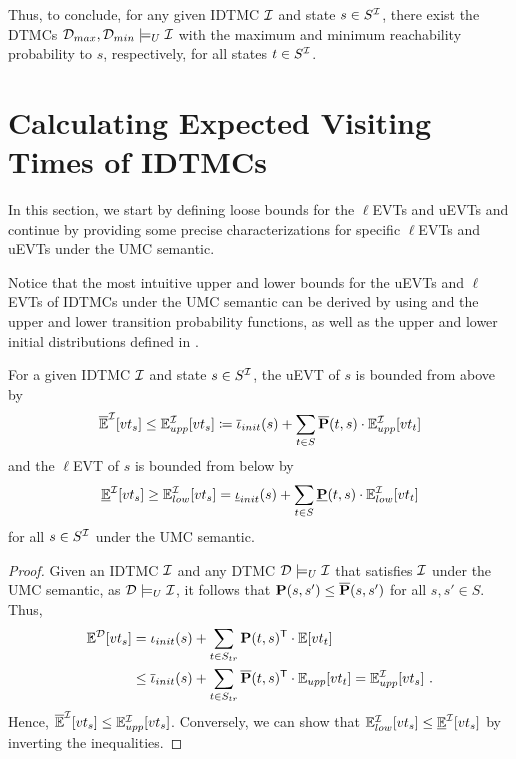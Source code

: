 Thus, to conclude, for any given IDTMC $\mathcal{I}$ and state $s\in S^{\mathcal{I}}$, there exist the DTMCs $\mathcal{D}_{max},\mathcal{D}_{min} \models_U \mathcal{I}$ with the maximum and minimum reachability probability to $s$, respectively, for all states $t\in S^{\mathcal{I}}$.

\section{Calculating Expected Visiting Times of IDTMCs}\label{sec:calculating_expected_visiting_times_of_IDTMCs}
In this section, we start by defining loose bounds for the $\ell$EVTs and uEVTs and continue by providing some precise characterizations for specific $\ell$EVTs and uEVTs under the UMC semantic.

Notice that the most intuitive upper and lower bounds for the uEVTs and $\ell$EVTs of IDTMCs under the UMC semantic can be derived by using  and the upper and lower transition probability functions, as well as the upper and lower initial distributions defined in .

\begin{theorem}\label{th:loose_bounds_for_evts}
    For a given IDTMC $\mathcal{I}$ and state $s\in S^{\mathcal{I}}$, the uEVT of $s$ is bounded from above by 
    \[\mathbb{\overline{E}}^{\mathcal{I}}[vt_s] \leq \mathbb{E}^{\mathcal{I}}_{upp}[vt_s] \coloneq \mathbf{\overline{\iota}}_{init}(s)+\sum_{t\in S}\mathbf{\overline{P}}(t,s)\cdot \mathbb{E}^{\mathcal{I}}_{upp}[vt_t]\]
    and the $\ell$EVT of $s$ is bounded from below by 
    \[\mathbb{\underline{E}}^{\mathcal{I}}[vt_s] \geq \mathbb{E}^{\mathcal{I}}_{low}[vt_s] = \mathbf{\underline{\iota}}_{init}(s)+\sum_{t\in S}\mathbf{\underline{P}}(t,s)\cdot \mathbb{E}^{\mathcal{I}}_{low}[vt_t]\]
    for all $s\in S^{\mathcal{I}}$ under the UMC semantic.
\end{theorem}
\begin{proof}
    Given an IDTMC $\mathcal{I}$ and any DTMC $\mathcal{D}\models_U \mathcal{I}$ that satisfies $\mathcal{I}$ under the UMC semantic, as $\mathcal{D} \models_U \mathcal{I}$, it follows that $\mathbf{P}(s,s')\leq \mathbf{\overline{P}}(s,s')$ for all $s,s'\in S$. Thus, 
    \begin{align}
        \mathbb{E}^{\mathcal{D}}[vt_s] 
        & = \iota_{init}(s)+\sum_{t\in S_{tr}}\mathbf{P}(t,s)^{\mathsf{T}}\cdot \mathbb{E}[vt_t] \notag \\
        & \leq \mathbf{\overline{\iota}}_{init}(s)+\sum_{t\in S_{tr}}\mathbf{\overline{P}}(t,s)^{\mathsf{T}}\cdot \mathbb{E}_{upp}[vt_t] = \mathbb{E}_{upp}^{\mathcal{I}}[vt_s]\ .\notag
    \end{align}
    Hence, $\mathbb{\overline{E}}^{\mathcal{I}}[vt_s] \leq \mathbb{E}_{upp}^{\mathcal{I}}[vt_s]$.
    Conversely, we can show that $\mathbb{E}_{low}^{\mathcal{I}}[vt_s] \leq \mathbb{\underline{E}}^{\mathcal{I}}[vt_s]$ by inverting the inequalities.
\end{proof}

